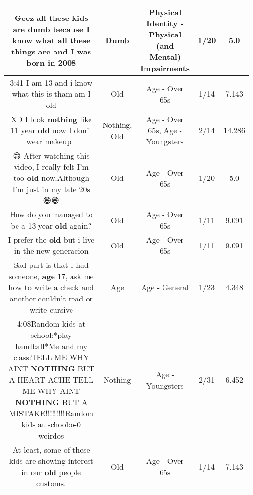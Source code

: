 \documentclass[11pt]{article}
\newlength\mylength
\begin{document}
\begin{center}
\begin{longtable}{|C{.65\mylength}|C{.30\mylength}|C{.12\mylength}|C{.12\mylength}|C{.12\mylength}|}
  \small Geez all these kids are \textbf{dumb} because I know what all these things are and I was born in 2008\normalsize   & Dumb & Physical Identity - Physical (and Mental) Impairments & 1/20 & 5.0 \\  \hline
  \small 3:41 I am 13 and i know what this is tham am I old\normalsize   & Old & Age - Over 65s & 1/14 & 7.143 \\  \hline
  \small XD I look \textbf{nothing} like 11 year \textbf{old} now I don't wear makeup 💄\normalsize   & Nothing, Old & Age - Over 65s, Age - Youngsters & 2/14 & 14.286 \\  \hline
  \small 😄 After watching this video, I really felt I'm too \textbf{old} now.Although I'm just in my late 20s 😄😄\normalsize   & Old & Age - Over 65s & 1/20 & 5.0 \\  \hline
  \small How do you managed to be a 13 year \textbf{old} again?\normalsize   & Old & Age - Over 65s & 1/11 & 9.091 \\  \hline
  \small I prefer the \textbf{old} but i live in the new generacion\normalsize   & Old & Age - Over 65s & 1/11 & 9.091 \\  \hline
  \small Sad part is that I had someone, \textbf{age} 17, ask me how to write a check and another couldn't read or write cursive\normalsize   & Age & Age - General & 1/23 & 4.348 \\  \hline
  \small 4:08Random kids at school:*play handball*Me and my class:TELL ME WHY AINT \textbf{NOTHING} BUT A HEART ACHE TELL ME WHY AINT \textbf{NOTHING} BUT A MISTAKE!!!!!!!!!Random kids at school:o-0 weirdos\normalsize   & Nothing & Age - Youngsters & 2/31 & 6.452 \\  \hline
  \small At least, some of these kids are showing interest in our \textbf{old} people customs.\normalsize   & Old & Age - Over 65s & 1/14 & 7.143 \\  \hline

\end{longtable}
\end{center}
\end{document}
